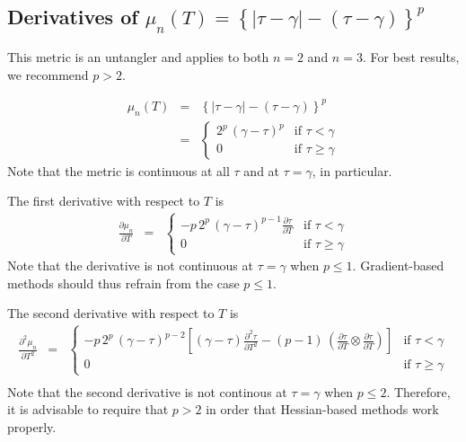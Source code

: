 \documentclass{report}
\begin{document}
\subsection{Derivatives of $\mu_n(T) = \left\{ |\tau-\gamma| - \left( \tau-\gamma \right) \right\}^p$ \label{untangle1}}

\noindent This metric is an untangler and applies to both $n=2$ and $n=3$. 
For best results, we recommend $p > 2$.
 
\begin{eqnarray}
\mu_n(T) & = & \left\{ |\tau-\gamma| - \left( \tau-\gamma \right) \right\}^p \\
         & = & \left\{ \begin{array}{cc} 
 2^p \, (\gamma-\tau)^p & \mbox{if $\tau<\gamma$} \\
0                       & \mbox{if $\tau \geq \gamma$}
\end{array} \right.
\end{eqnarray}
Note that the metric is continuous at all $\tau$ and at $\tau=\gamma$, in 
particular. \newline

\noindent The first derivative with respect to $T$ is
\begin{eqnarray}
\frac{\partial \mu_n}{\partial T} & = & \left\{ \begin{array}{cc} 
- p \, 2^p \, (\gamma-\tau)^{p-1} \frac{\partial \tau}{\partial T} & \mbox{if $\tau<\gamma$} \\
0                      & \mbox{if $\tau \geq \gamma$}
\end{array} \right.
\end{eqnarray}
Note that the derivative is not continuous at $\tau=\gamma$ when $p \leq 1$. 
Gradient-based methods should thus refrain from the case $p \leq 1$.

\noindent The second derivative with respect to $T$ is
\begin{eqnarray}
\frac{\partial^2 \mu_n}{\partial T^2} & = & \left\{ \begin{array}{cc} 
-p \, 2^p \, (\gamma-\tau)^{p-2} \left[ (\gamma-\tau) \frac{\partial^2 \tau}{\partial T^2} - (p-1) \, \left( \frac{\partial \tau}{\partial T} \otimes \frac{\partial \tau}{\partial T} \right) \right] & \mbox{if $\tau<\gamma$} \\
0                      & \mbox{if $\tau \geq \gamma$} 
\end{array} \right. \nonumber \\
\end{eqnarray}
Note that the second derivative is not continous at $\tau=\gamma$ when 
$p \leq 2$.   Therefore, it is advisable to require that $p > 2$ in 
order that Hessian-based methods work properly. \newline
\end{document}
